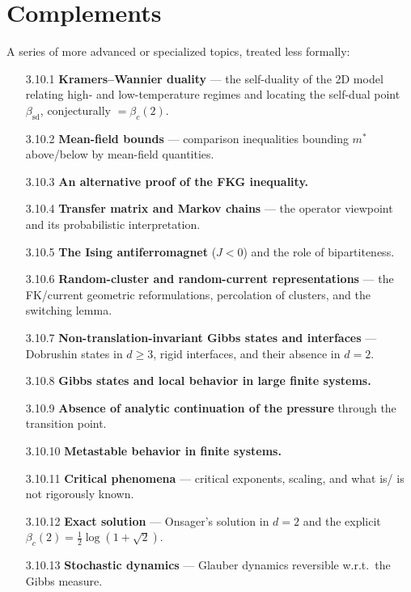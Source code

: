 \documentclass[11pt]{article}
\theoremstyle{plain}
\theoremstyle{definition}
\theoremstyle{remark}
\begin{document}
\section{Complements}
A series of more advanced or specialized topics, treated less formally:
\begin{itemize}
  \item[3.10.1] \textbf{Kramers--Wannier duality} — the self-duality of the 2D
        model relating high- and low-temperature regimes and locating the
        self-dual point $\beta_{\mathrm{sd}}$, conjecturally $=\beta_c(2)$.
  \item[3.10.2] \textbf{Mean-field bounds} — comparison inequalities bounding
        $m^*$ above/below by mean-field quantities.
  \item[3.10.3] \textbf{An alternative proof of the FKG inequality.}
  \item[3.10.4] \textbf{Transfer matrix and Markov chains} — the operator
        viewpoint and its probabilistic interpretation.
  \item[3.10.5] \textbf{The Ising antiferromagnet} ($J<0$) and the role of
        bipartiteness.
  \item[3.10.6] \textbf{Random-cluster and random-current representations} —
        the FK/current geometric reformulations, percolation of clusters, and
        the switching lemma.
  \item[3.10.7] \textbf{Non-translation-invariant Gibbs states and interfaces}
        — Dobrushin states in $d\ge3$, rigid interfaces, and their absence in
        $d=2$.
  \item[3.10.8] \textbf{Gibbs states and local behavior in large finite
        systems.}
  \item[3.10.9] \textbf{Absence of analytic continuation of the pressure}
        through the transition point.
  \item[3.10.10] \textbf{Metastable behavior in finite systems.}
  \item[3.10.11] \textbf{Critical phenomena} — critical exponents, scaling, and
        what is/ is not rigorously known.
  \item[3.10.12] \textbf{Exact solution} — Onsager's solution in $d=2$ and the
        explicit $\beta_c(2)=\tfrac12\log(1+\sqrt2)$.
  \item[3.10.13] \textbf{Stochastic dynamics} — Glauber dynamics reversible
        w.r.t.\ the Gibbs measure.
\end{itemize}
\end{document}
